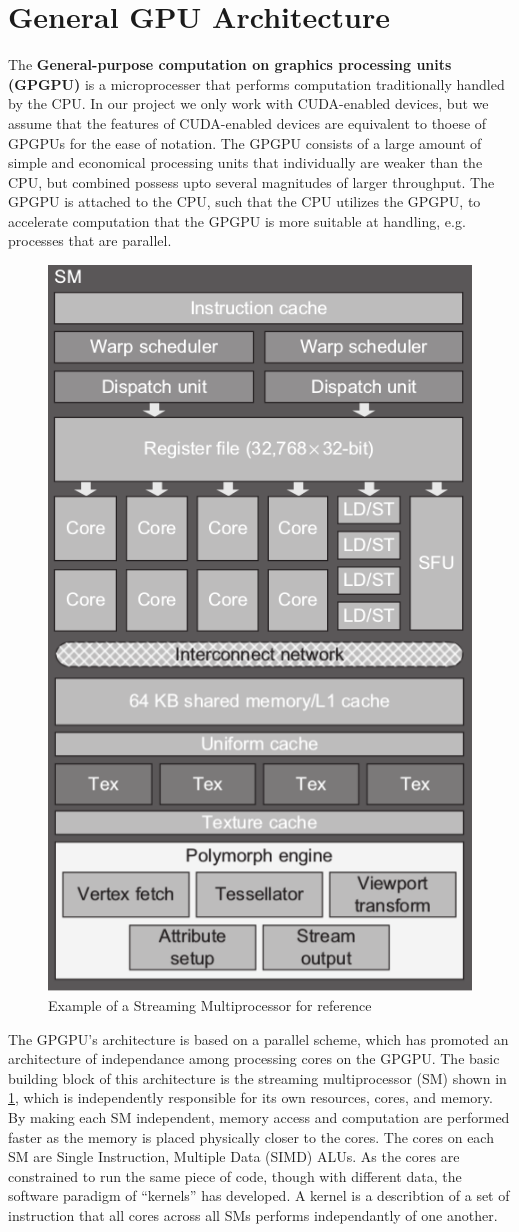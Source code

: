 \section{General GPU Architecture}
\label{sec:gpu}

The \textbf{General-purpose computation on graphics processing units (GPGPU)} is a microprocesser that performs computation traditionally handled by the CPU.
In our project we only work with CUDA-enabled devices, but we assume that the features of CUDA-enabled devices are equivalent to thoese of GPGPUs for the ease of notation.
The GPGPU consists of a large amount of simple and economical processing units that individually are weaker than the CPU, but combined possess upto several magnitudes of larger throughput.
The GPGPU is attached to the CPU, such that the CPU utilizes the GPGPU, to accelerate computation that the GPGPU is more suitable at handling, e.g. processes that are parallel.

\begin{figure}[htb]
  \centering
  \includegraphics[width=.5\textwidth]{graphics/images/cropped-cuda-sm.png}
  \caption{Example of a Streaming Multiprocessor for reference~\cite{farber2011cuda}}
  \label{fig:sm example}
\end{figure}

The GPGPU's architecture is based on a parallel scheme, which has promoted an architecture of independance among processing cores on the GPGPU.
The basic building block of this architecture is the streaming multiprocessor (SM) shown in \cref{fig:sm example}, which is independently responsible for its own resources, cores, and memory.
By making each SM independent, memory access and computation are performed faster as the memory is placed physically closer to the cores.
The cores on each SM are Single Instruction, Multiple Data (SIMD) ALUs.
As the cores are constrained to run the same piece of code, though with different data, the software paradigm of ``kernels'' has developed.
A kernel is a describtion of a set of instruction that all cores across all SMs performs independantly of one another.

